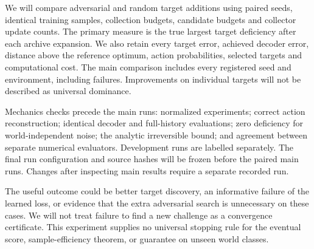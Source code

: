 \documentclass[11pt]{article}
\begin{document}
We will compare adversarial and random target additions using paired seeds,
identical training samples, collection budgets, candidate budgets and collector
update counts. The primary measure is the true largest target deficiency after
each archive expansion. We also retain every target error, achieved decoder
error, distance above the reference optimum, action probabilities, selected
targets and computational cost. The main comparison includes every registered
seed and environment, including failures. Improvements on individual targets
will not be described as universal dominance.

Mechanics checks precede the main runs: normalized experiments; correct action
reconstruction; identical decoder and full-history evaluations; zero deficiency
for world-independent noise; the analytic irreversible bound; and agreement
between separate numerical evaluators. Development runs are labelled separately.
The final run configuration and source hashes will be frozen before the paired
main runs. Changes after inspecting main results require a separate recorded run.

The useful outcome could be better target discovery, an informative failure of
the learned loss, or evidence that the extra adversarial search is unnecessary
on these cases. We will not treat failure to find a new challenge as a convergence
certificate. This experiment supplies no universal stopping rule for the eventual
score, sample-efficiency theorem, or guarantee on unseen world classes.
\end{document}

